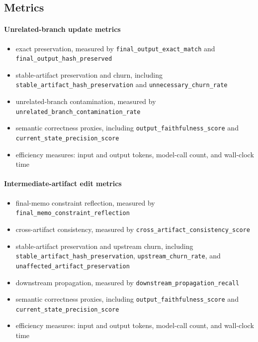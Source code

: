\documentclass{article}
\begin{document}
\subsection{Metrics}

\paragraph{Unrelated-branch update metrics}
\begin{itemize}
\item exact preservation, measured by \texttt{final\_output\_exact\_match} and \texttt{final\_output\_hash\_preserved}
\item stable-artifact preservation and churn, including \texttt{stable\_artifact\_hash\_preservation} and \texttt{unnecessary\_churn\_rate}
\item unrelated-branch contamination, measured by \texttt{unrelated\_branch\_contamination\_rate}
\item semantic correctness proxies, including \texttt{output\_faithfulness\_score} and \texttt{current\_state\_precision\_score}
\item efficiency measures: input and output tokens, model-call count, and wall-clock time
\end{itemize}

\paragraph{Intermediate-artifact edit metrics}
\begin{itemize}
\item final-memo constraint reflection, measured by \texttt{final\_memo\_constraint\_reflection}
\item cross-artifact consistency, measured by \texttt{cross\_artifact\_consistency\_score}
\item stable-artifact preservation and upstream churn, including \texttt{stable\_artifact\_hash\_preservation}, \texttt{upstream\_churn\_rate}, and \texttt{unaffected\_artifact\_preservation}
\item downstream propagation, measured by \texttt{downstream\_propagation\_recall}
\item semantic correctness proxies, including \texttt{output\_faithfulness\_score} and \texttt{current\_state\_precision\_score}
\item efficiency measures: input and output tokens, model-call count, and wall-clock time
\end{itemize}
\end{document}
